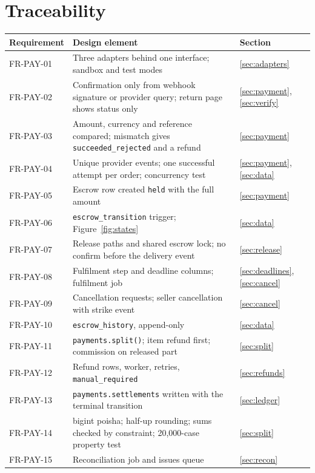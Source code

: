 \documentclass[11pt,a4paper]{article}
\begin{document}
\section{Traceability}
\label{app:trace}
{\small\begin{longtable}{@{}>{\ttfamily}p{2.4cm}>{\raggedright\arraybackslash}p{10.6cm}>{\raggedright\arraybackslash}p{2.2cm}@{}}
\toprule \textnormal{\textbf{Requirement}} & \textbf{Design element} & \textbf{Section} \\ \midrule \endhead
FR-PAY-01 & Three adapters behind one interface; sandbox and test modes & \ref{sec:adapters} \\
FR-PAY-02 & Confirmation only from webhook signature or provider query; return page shows status only & \ref{sec:payment}, \ref{sec:verify} \\
FR-PAY-03 & Amount, currency and reference compared; mismatch gives \texttt{succeeded\_rejected} and a refund & \ref{sec:payment} \\
FR-PAY-04 & Unique provider events; one successful attempt per order; concurrency test & \ref{sec:payment}, \ref{sec:data} \\
FR-PAY-05 & Escrow row created \texttt{held} with the full amount & \ref{sec:payment} \\
FR-PAY-06 & \texttt{escrow\_transition} trigger; Figure~\ref{fig:states} & \ref{sec:data} \\
FR-PAY-07 & Release paths and shared escrow lock; no confirm before the delivery event & \ref{sec:release} \\
FR-PAY-08 & Fulfilment step and deadline columns; fulfilment job & \ref{sec:deadlines}, \ref{sec:cancel} \\
FR-PAY-09 & Cancellation requests; seller cancellation with strike event & \ref{sec:cancel} \\
FR-PAY-10 & \texttt{escrow\_history}, append-only & \ref{sec:data} \\
FR-PAY-11 & \texttt{payments.split()}; item refund first; commission on released part & \ref{sec:split} \\
FR-PAY-12 & Refund rows, worker, retries, \texttt{manual\_required} & \ref{sec:refunds} \\
FR-PAY-13 & \texttt{payments.settlements} written with the terminal transition & \ref{sec:ledger} \\
FR-PAY-14 & bigint poisha; half-up rounding; sums checked by constraint; 20{,}000-case property test & \ref{sec:split} \\
FR-PAY-15 & Reconciliation job and issues queue & \ref{sec:recon} \\

\end{longtable}}
\end{document}
